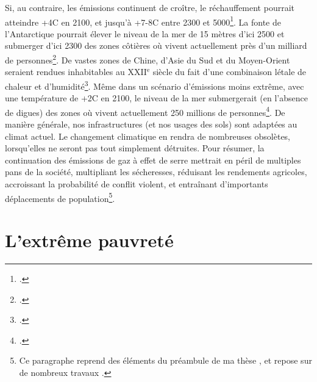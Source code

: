 \documentclass[a5paper,french]{memoir}
\begin{document}
Si, au contraire, les émissions continuent de croître, le réchauffement pourrait atteindre +4\textdegree{}C en 2100, et jusqu'à +7-8\textdegree{}C entre 2300 et 5000\footnote{\citet{montenegro_long_2007}.}. La fonte de l'Antarctique pourrait élever le niveau de la mer de 15 mètres d'ici 2500 et submerger d'ici 2300 des zones côtières où vivent actuellement près d'un milliard de personnes\footnote{\citet{deconto_contribution_2016,kopp_evolving_2017}.}. De vastes zones de Chine, d'Asie du Sud et du Moyen-Orient seraient rendues inhabitables au XXII$^\text{e}$ siècle du fait d'une combinaison létale de chaleur et d'humidité\footnote{\citet{pal_future_2016,im_deadly_2017,kang_north_2018}.}. Même dans un scénario d'émissions moins extrême, avec une température de +2\textdegree{}C en 2100, le niveau de la mer submergerait (en l'absence de digues) des zones où vivent actuellement 250 millions de personnes\footnote{\citet{kulp_new_2019}.}. De manière générale, nos infrastructures (et nos usages des sols) sont adaptées au climat actuel. Le changement climatique en rendra de nombreuses obsolètes, lorsqu'elles ne seront pas tout simplement détruites. Pour résumer, la continuation des émissions de gaz à effet de serre mettrait en péril de multiples pans de la société, multipliant les sécheresses, réduisant les rendements agricoles, accroissant la probabilité de conflit violent, et entraînant d'importants déplacements de population\footnote{Ce paragraphe reprend des éléments du préambule de ma thèse \citep{fabre_is_2020}, et repose sur de nombreux travaux \citep{burke_warming_2009,cattaneo_human_2019,carleton_social_2016,dell_temperature_2012,elliott_constraints_2014,schlenker_robust_2010,moore_new_2017}.}. 


\section{L'extrême pauvreté} %
\end{document}
